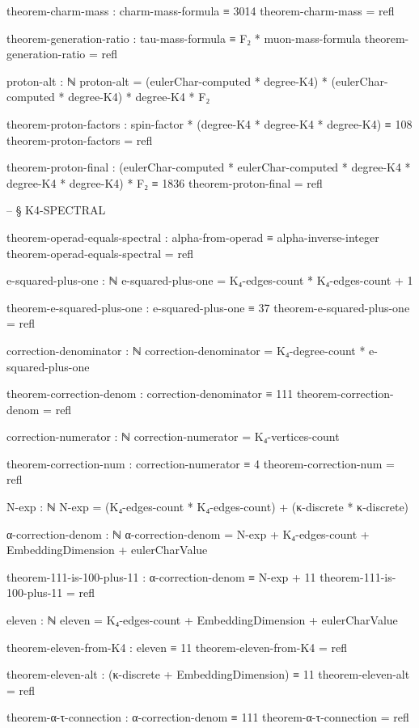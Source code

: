 \documentclass[11pt,a4paper]{book}
\begin{document}
\begin{code}
theorem-charm-mass : charm-mass-formula ≡ 3014
theorem-charm-mass = refl

theorem-generation-ratio : tau-mass-formula ≡ F₂ * muon-mass-formula
theorem-generation-ratio = refl

proton-alt : ℕ
proton-alt = (eulerChar-computed * degree-K4) * (eulerChar-computed * degree-K4) * degree-K4 * F₂

theorem-proton-factors : spin-factor * (degree-K4 * degree-K4 * degree-K4) ≡ 108
theorem-proton-factors = refl

theorem-proton-final : (eulerChar-computed * eulerChar-computed * degree-K4 * degree-K4 * degree-K4) * F₂ ≡ 1836
theorem-proton-final = refl




-- § K4-SPECTRAL

theorem-operad-equals-spectral : alpha-from-operad ≡ alpha-inverse-integer
theorem-operad-equals-spectral = refl

e-squared-plus-one : ℕ
e-squared-plus-one = K₄-edges-count * K₄-edges-count + 1

theorem-e-squared-plus-one : e-squared-plus-one ≡ 37
theorem-e-squared-plus-one = refl

correction-denominator : ℕ
correction-denominator = K₄-degree-count * e-squared-plus-one

theorem-correction-denom : correction-denominator ≡ 111
theorem-correction-denom = refl

correction-numerator : ℕ
correction-numerator = K₄-vertices-count

theorem-correction-num : correction-numerator ≡ 4
theorem-correction-num = refl

N-exp : ℕ
N-exp = (K₄-edges-count * K₄-edges-count) + (κ-discrete * κ-discrete)

α-correction-denom : ℕ
α-correction-denom = N-exp + K₄-edges-count + EmbeddingDimension + eulerCharValue

theorem-111-is-100-plus-11 : α-correction-denom ≡ N-exp + 11
theorem-111-is-100-plus-11 = refl

eleven : ℕ
eleven = K₄-edges-count + EmbeddingDimension + eulerCharValue

theorem-eleven-from-K4 : eleven ≡ 11
theorem-eleven-from-K4 = refl

theorem-eleven-alt : (κ-discrete + EmbeddingDimension) ≡ 11
theorem-eleven-alt = refl

theorem-α-τ-connection : α-correction-denom ≡ 111
theorem-α-τ-connection = refl



\end{code}
\end{document}
